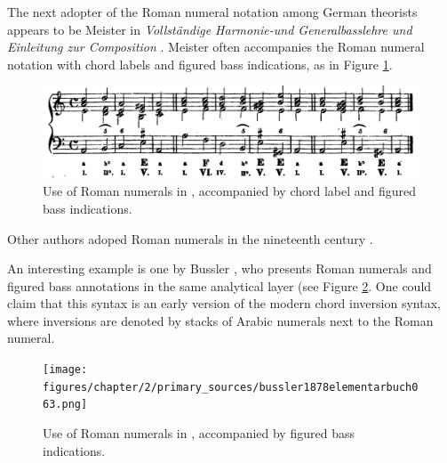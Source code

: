 The next adopter of the Roman numeral notation among German theorists appears to be Meister in \emph{Vollständige Harmonie-und Generalbasslehre und Einleitung zur Composition} \cite{meister1852vollstandige}.
Meister often accompanies the Roman numeral notation with chord labels and figured bass indications, as in Figure \ref{fig:meister1852vollstandige32}.

\begin{figure}
    \centering
    \includegraphics[width=\textwidth]{figures/chapter/2/primary_sources/meister1852vollstaendige32.png}
    \caption{Use of Roman numerals in \cite{meister1852vollstandige}, accompanied by chord label and figured bass indications.}
    \label{fig:meister1852vollstandige32}
\end{figure}

Other authors adoped Roman numerals in the nineteenth century \cite{sechter1853grundsatze, richter1860lehrbuch, tiersch1874elementarbuch, tracy1878theory}.

An interesting example is one by Bussler \cite{bussler1878praktische}, who presents Roman numerals and figured bass annotations in the same analytical layer (see Figure \ref{fig:bussler1878elementarbuch020}.
One could claim that this syntax is an early version of the modern chord inversion syntax, where inversions are denoted by stacks of Arabic numerals next to the Roman numeral.

\begin{figure}
    \centering
    \texttt{[image: figures/chapter/2/primary\_sources/bussler1878elementarbuch063.png]}
    \caption{Use of Roman numerals in \cite{bussler1878praktische}, accompanied by figured bass indications.}
    \label{fig:bussler1878elementarbuch020}
\end{figure}

